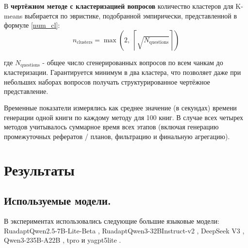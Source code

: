 \documentclass{superfri}
\begin{document}
В \textbf{чертёжном методе с кластеризацией вопросов} количество кластеров для K-means выбирается по эвристике, подобранной эмпирически, представленной в формуле \eqref{num_cl}:
\begin{equation}\label{num_cl}
  n_{\text{clusters}} = \max\!\left(2,\; \left\lceil \sqrt{N_{\text{questions}}} \right\rceil\right)
\end{equation}

где $N_{\text{questions}}$ - общее число сгенерированных вопросов по всем чанкам до кластеризации. 
Гарантируется минимум в два кластера, что позволяет даже при небольших наборах вопросов получать структурированное чертёжное представление.

Временные показатели измерялись как среднее значение (в секундах) времени генерации одной книги по каждому методу для 100 книг. 
В случае всех четырех методов учитывалось суммарное время всех этапов (включая генерацию промежуточных рефератов / планов, фильтрацию и финальную агрегацию).


\section{Результаты}

\subsection{Используемые модели.}
В экспериментах использовались следующие большие языковые модели: 
RuadaptQwen2.5-\allowbreak 7B-\allowbreak Lite-\allowbreak Beta \cite{ruadapt}, 
RuadaptQwen3-\allowbreak 32BInstruct-v2 \cite{ruadapt}, 
DeepSeek V3 \cite{deepseek}, 
Qwen3-\allowbreak 235B-\allowbreak A22B \cite{qwen3}, 
tpro \cite{tpro} и yagpt5lite \cite{yagpt}.
\end{document}
